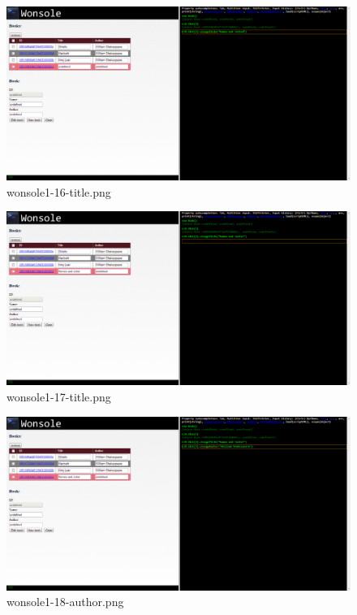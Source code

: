 \begin{figure}
\includegraphics[width=\textwidth]{screenshot/wonsole1-16-title.png}
\caption{wonsole1-16-title.png}
\label{wonsole1-16-title.png}
\end{figure}


\clearpage
\begin{figure}
\includegraphics[width=\textwidth]{screenshot/wonsole1-17-title.png}
\caption{wonsole1-17-title.png}
\label{wonsole1-17-title.png}
\end{figure}


\begin{figure}
\includegraphics[width=\textwidth]{screenshot/wonsole1-18-author.png}
\caption{wonsole1-18-author.png}
\label{wonsole1-18-author.png}
\end{figure}


